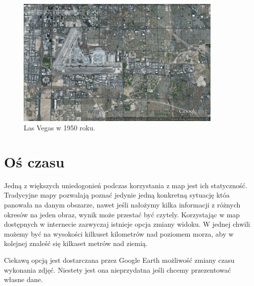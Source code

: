 \begin{figure}[H]
  \centering
    \includegraphics[width=100mm]{ge/03_2012.jpg}
  \caption{Las Vegas w 1950 roku.}
  \label{fig:lasVegas3}
\end{figure}

\section{Oś czasu}
\label{sec:osCzasu}

Jedną z większych uniedogonień podczas korzystania z map jest ich statyczność. Tradycyjne mapy pozwalają poznać jedynie jedną konkretną sytuację któa panowała na danym obszarze, nawet jeśli nałożymy kilka informacji z różnych okresów na jeden obraz, wynik może przestać być czytely. Korzystając w map dostępnych w internecie zazwyczaj istnieje opcja zmiany widoku. W jednej chwili możemy być na wysokości kilkuset kilometrów nad poziomem morza, aby w kolejnej znaleść się kilkaset metrów nad ziemią.

Ciekawą opcją jest dostarczana przez Google Earth możliwość zmiany czasu wykonania zdjęć. Niestety jest ona nieprzydatna jeśli chcemy przezentować własne dane.





